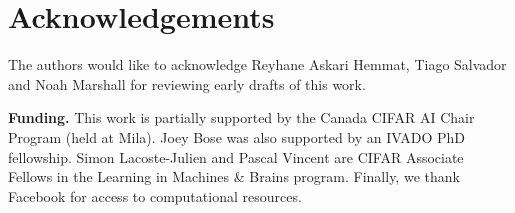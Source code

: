 \section*{Acknowledgements}

The authors would like to acknowledge Reyhane Askari Hemmat, Tiago Salvador and Noah Marshall for reviewing early drafts of this work.

\textbf{Funding.} This work is partially supported by the Canada CIFAR AI Chair Program (held at Mila).
Joey Bose was also supported by an IVADO PhD fellowship.
Simon Lacoste-Julien and Pascal Vincent are CIFAR Associate Fellows in the Learning in Machines \& Brains program. Finally, we thank Facebook for access to computational resources.